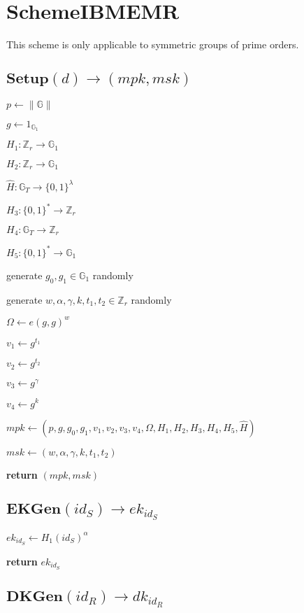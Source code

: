 \documentclass[a4paper]{article}
\begin{document}
\section{SchemeIBMEMR}

This scheme is only applicable to symmetric groups of prime orders. 

\subsection{$\textbf{Setup}(d) \rightarrow (\textit{mpk}, \textit{msk})$}

$p \gets \|\mathbb{G}\|$

$g \gets 1_{\mathbb{G}_1}$

$H_1: \mathbb{Z}_r \rightarrow \mathbb{G}_1$

$H_2: \mathbb{Z}_r \rightarrow \mathbb{G}_1$

$\hat{H}: \mathbb{G}_T \rightarrow \{0, 1\}^\lambda$

$H_3: \{0, 1\}^* \rightarrow \mathbb{Z}_r$

$H_4: \mathbb{G}_T \rightarrow \mathbb{Z}_r$

$H_5: \{0, 1\}^* \rightarrow \mathbb{G}_1$

generate $g_0, g_1 \in \mathbb{G}_1$ randomly

generate $w, \alpha, \gamma, k, t_1, t_2 \in \mathbb{Z}_r$ randomly

$\Omega \gets e(g, g)^w$

$v_1 \gets g^{t_1}$

$v_2 \gets g^{t_2}$

$v_3 \gets g^\gamma$

$v_4 \gets g^k$

$ \textit{mpk} \gets (p, g, g_0, g_1, v_1, v_2, v_3, v_4, \Omega, H_1, H_2, H_3, H_4, H_5, \hat{H})$

$\textit{msk} \gets (w, \alpha, \gamma, k, t_1, t_2)$

\textbf{return} $(\textit{mpk}, \textit{msk})$

\subsection{$\textbf{EKGen}(\textit{id}_S) \rightarrow \textit{ek}_{\textit{id}_S}$}

$\textit{ek}_{\textit{id}_S} \gets H_1(\textit{id}_S)^\alpha$

\textbf{return} $\textit{ek}_{\textit{id}_S}$

\subsection{$\textbf{DKGen}(\textit{id}_R) \rightarrow \textit{dk}_{\textit{id}_R}$}
\end{document}
